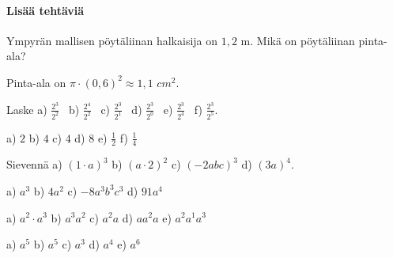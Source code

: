 \begin{tehtavasivu}
\paragraph*{Lisää tehtäviä}

    \begin{tehtava}
        Ympyrän mallisen pöytäliinan halkaisija on $1,2$ m. Mikä on pöytäliinan pinta-ala?
       
        \begin{vastaus}
        Pinta-ala on $\pi \cdot (0{,}6)^2 \approx 1,1$ $cm^2$.
        \end{vastaus}
\end{tehtava}

\begin{tehtava}
        Laske \quad
        a) $\displaystyle \frac{2^3}{2^2}$ \quad \
        b) $\displaystyle \frac{2^4}{2^2}$ \quad \
        c) $\displaystyle \frac{2^3}{2^1}$ \quad \
        d) $\displaystyle \frac{2^3}{2^0}$ \quad \
        e) $\displaystyle \frac{2^3}{2^4}$ \quad \
        f) $\displaystyle \frac{2^3}{2^5}$.
        
        \begin{vastaus}
            a) $2$ \qquad
            b) $4$ \qquad
            c) $4$ \qquad
            d) $8$ \qquad
            e) $\frac{1}{2}$ \qquad
            f) $\frac{1}{4}$
        \end{vastaus}
    \end{tehtava}


 \begin{tehtava}
        Sievennä 
        a) $(1\cdot a)^3$ \qquad
        b) $(a\cdot 2)^2$ \qquad
        c) $(-2abc)^3$ \qquad
        d) $(3a)^4$.

        \begin{vastaus}
            a) $a^3$ \qquad
            b) $4a^2$ \qquad
            c) $-8a^3b^3c^3$ \qquad
            d) $91a^4$
        \end{vastaus}
    \end{tehtava}
       
    \begin{tehtava}
        a) $a^2\cdot a^3$ \qquad
        b) $a^3a^2$ \qquad
        c) $a^2 a$ \qquad
        d) $a a^2 a$ \qquad
        e) $a^2a^1a^3$
        
        \begin{vastaus}
            a) $a^5$ \qquad
            b) $a^5$ \qquad
            c) $a^3$ \qquad
            d) $a^4$ \qquad
            e) $a^6$
        \end{vastaus}
    \end{tehtava}
    

\end{tehtavasivu}
